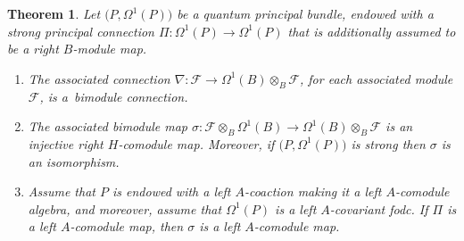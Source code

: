 \documentclass[pdftex]{sigma}
\numberwithin{equation}{section}
\newtheorem{Theorem}{Theorem}[section]
\begin{document}
\begin{Theorem}\label{thm:theTheorem}
Let $\big(P, \Omega^1(P)\big)$ be a quantum principal bundle, endowed with a strong principal connection $\Pi\colon \Omega^1(P) \to \Omega^1(P)$ that is additionally assumed to be a right $B$-module map.
\begin{enumerate}\itemsep=0pt
 \item[$1.$] The associated connection $\nabla\colon \mathcal{F} \to \Omega^1(B) \otimes_B \mathcal{F}$, for each associated module $\mathcal{F}$, is a~bimodule connection.
 \item[$2.$] The associated bimodule map $\sigma\colon \mathcal{F} \otimes_B \Omega^1(B) \to \Omega^1(B) \otimes_B \mathcal{F}$ is an injective right $H$-comodule map. Moreover, if $\big(P, \Omega^1(P)\big)$ is strong then $\sigma$ is an isomorphism.
 \item[$3.$] Assume that $P$ is endowed with a left $A$-coaction making it a left $A$-comodule algebra, and moreover, assume that $\Omega^1(P)$ is a left $A$-covariant fodc. If $\Pi$ is a left $A$-comodule map, then $\sigma$ is a left $A$-comodule map.
 \end{enumerate}
\end{Theorem}
\end{document}
